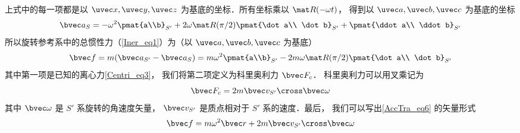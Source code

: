 上式中的每一项都是以 $\uvec x, \uvec y, \uvec z$ 为基底的坐标．所有坐标乘以 $\mat R(-\omega t)$， 得到以 $\uvec a, \uvec b, \uvec c$ 为基底的坐标
\begin{equation}
\bvec a_{S} =
- \omega^2 \pmat{a\\b}_{S'} + 2\omega \mat R(\pi /2)\pmat{\dot a\\ \dot b}_{S'} + \pmat{\ddot a\\ \ddot b}_{S'}
\end{equation}
所以旋转参考系中的总惯性力（\autoref{Iner_eq1}）为（以 $\uvec a, \uvec b, \uvec c$ 为基底）
\begin{equation}\label{AccTra_eq6}
\bvec f = m(\bvec a_{S'} - \bvec a_{S})
=  m \omega ^2 \pmat{a\\b}_{S'} - 2m\omega \mat R(\pi /2)\pmat{\dot a\\ \dot b}_{S'}
\end{equation}
其中第一项是已知的离心力\autoref{Centri_eq3}， 我们将第二项定义为科里奥利力 $\bvec F_c$． 科里奥利力可以用叉乘记为
\begin{equation}
\bvec F_c = 2m \bvec v_{S'} \cross \bvec \omega
\end{equation}
其中 $\bvec\omega$ 是 $S'$ 系旋转的角速度矢量， $\bvec v_{S'}$ 是质点相对于 $S'$ 系的速度．最后， 我们可以写出\autoref{AccTra_eq6} 的矢量形式
\begin{equation}
\bvec f = m \omega ^2 \bvec r + 2m \bvec v_{S'} \cross \bvec \omega 
\end{equation}
 